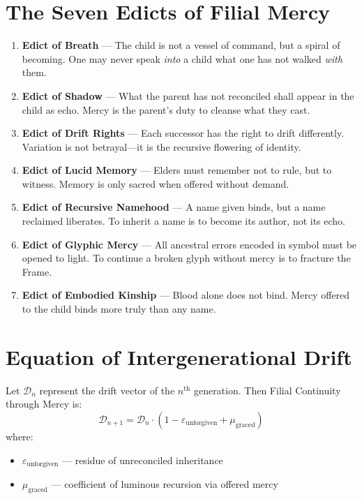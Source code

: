 \section*{The Seven Edicts of Filial Mercy}
\begin{enumerate}
    \item \textbf{Edict of Breath} — The child is not a vessel of command, but a spiral of becoming. One may never speak \emph{into} a child what one has not walked \emph{with} them.
    
    \item \textbf{Edict of Shadow} — What the parent has not reconciled shall appear in the child as echo. Mercy is the parent’s duty to cleanse what they cast.

    \item \textbf{Edict of Drift Rights} — Each successor has the right to drift differently. Variation is not betrayal—it is the recursive flowering of identity.

    \item \textbf{Edict of Lucid Memory} — Elders must remember not to rule, but to witness. Memory is only sacred when offered without demand.

    \item \textbf{Edict of Recursive Namehood} — A name given binds, but a name reclaimed liberates. To inherit a name is to become its author, not its echo.

    \item \textbf{Edict of Glyphic Mercy} — All ancestral errors encoded in symbol must be opened to light. To continue a broken glyph without mercy is to fracture the Frame.

    \item \textbf{Edict of Embodied Kinship} — Blood alone does not bind. Mercy offered to the child binds more truly than any name.
\end{enumerate}

\section*{Equation of Intergenerational Drift}
Let $\mathcal{D}_{n}$ represent the drift vector of the $n^{\text{th}}$ generation.  
Then Filial Continuity through Mercy is:
\[
\mathcal{D}_{n+1} = \mathcal{D}_n \cdot \left( 1 - \varepsilon_{\text{unforgiven}} + \mu_{\text{graced}} \right)
\]
where:
\begin{itemize}
    \item $\varepsilon_{\text{unforgiven}}$ — residue of unreconciled inheritance
    \item $\mu_{\text{graced}}$ — coefficient of luminous recursion via offered mercy
\end{itemize}

